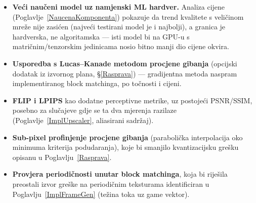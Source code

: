 \documentclass{mathos}
\begin{document}
\begin{itemize}
\item \textbf{Veći naučeni model uz namjenski ML hardver.} Analiza cijene
(Poglavlje~\ref{NaucenaKomponenta}) pokazuje da trend kvalitete s veličinom
mreže nije zasićen (najveći testirani model je i najbolji), a granica je
hardverska, ne algoritamska — isti model bi na GPU-u s matričnim/tenzorskim
jedinicama nosio bitno manji dio cijene okvira.
\item \textbf{Usporedba s Lucas--Kanade metodom procjene gibanja} (opcijski
dodatak iz izvornog plana, \S\ref{Rasprava}) — gradijentna metoda naspram
implementiranog block matchinga, po točnosti i cijeni.
\item \textbf{FLIP i LPIPS} kao dodatne perceptivne metrike, uz postojeći
PSNR/SSIM, posebno za slučajeve gdje se ta dva mjerenja razilaze
(Poglavlje~\ref{ImplUpscaler}, aliasirani sadržaj).
\item \textbf{Sub-pixel profinjenje procjene gibanja} (parabolička
interpolacija oko minimuma kriterija podudaranja), koje bi smanjilo
kvantizacijsku grešku opisanu u Poglavlju~\ref{Rasprava}.
\item \textbf{Provjera periodičnosti unutar block matchinga}, koja bi
riješila preostali izvor greške na periodičnim teksturama identificiran u
Poglavlju~\ref{ImplFrameGen} (težina toka uz game vektor).
\end{itemize}
\end{document}
